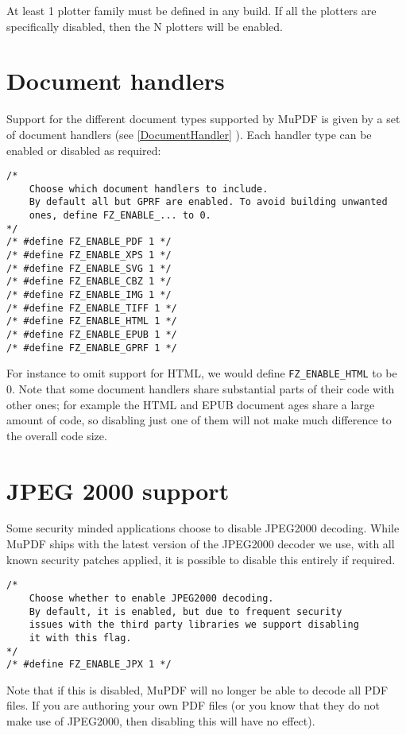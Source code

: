 \documentclass[oneside]{book}
\newcommand{\rjwref}[1] {\autoref{#1} \nameref{#1}}
\begin{document}
At least 1 plotter family must be defined in any build. If all the plotters are specifically disabled, then the N plotters will be enabled.

\section{Document handlers}

Support for the different document types supported by MuPDF is given by  a set of document handlers (see \rjwref{DocumentHandler}). Each handler type can be enabled or disabled as required:

\begin{lstlisting}
/*
	Choose which document handlers to include.
	By default all but GPRF are enabled. To avoid building unwanted
	ones, define FZ_ENABLE_... to 0.
*/
/* #define FZ_ENABLE_PDF 1 */
/* #define FZ_ENABLE_XPS 1 */
/* #define FZ_ENABLE_SVG 1 */
/* #define FZ_ENABLE_CBZ 1 */
/* #define FZ_ENABLE_IMG 1 */
/* #define FZ_ENABLE_TIFF 1 */
/* #define FZ_ENABLE_HTML 1 */
/* #define FZ_ENABLE_EPUB 1 */
/* #define FZ_ENABLE_GPRF 1 */
\end{lstlisting}

For instance to omit support for HTML, we would define \texttt{FZ\_ENABLE\_HTML} to be 0. Note that some document handlers share substantial parts of their code with other ones; for example the HTML and EPUB document ages share a large amount of code, so disabling just one of them will not make much difference to the overall code size.

\section{JPEG 2000 support}

Some security minded applications choose to disable JPEG2000 decoding. While MuPDF ships with the latest version of the JPEG2000 decoder we use, with all known security patches applied, it is possible to disable this entirely if required.

\begin{lstlisting}
/*
	Choose whether to enable JPEG2000 decoding.
	By default, it is enabled, but due to frequent security
	issues with the third party libraries we support disabling
	it with this flag.
*/
/* #define FZ_ENABLE_JPX 1 */
\end{lstlisting}

Note that if this is disabled, MuPDF will no longer be able to decode all PDF files. If you are authoring your own PDF files (or you know that they do not make use of JPEG2000, then disabling this will have no effect).
\end{document}
